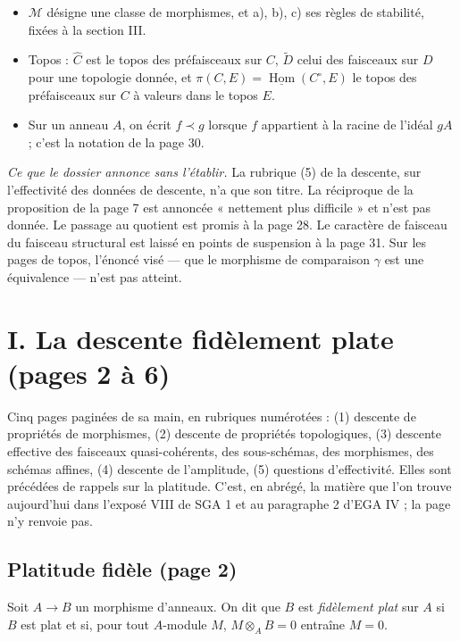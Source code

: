 \documentclass[11pt,a4paper]{article}
\begin{document}
\begin{itemize}
  « fidèlement plat et quasi-compact ».
  \item $\mathcal{M}$ désigne une classe de morphismes, et a), b), c) ses
  règles de stabilité, fixées à la section III.
  \item Topos : $\widehat{C}$ est le topos des préfaisceaux sur $C$,
  $\widetilde{D}$ celui des faisceaux sur $D$ pour une topologie donnée, et
  $\pi(C, E) = \underline{\operatorname{Hom}}(C^{\circ}, E)$ le topos des
  préfaisceaux sur $C$ à valeurs dans le topos $E$.
  \item Sur un anneau $A$, on écrit $f \prec g$ lorsque $f$ appartient à la
  racine de l'idéal $gA$ ; c'est la notation de la page 30.
\end{itemize}

\emph{Ce que le dossier annonce sans l'établir.} La rubrique (5) de la
descente, sur l'effectivité des données de descente, n'a que son titre. La
réciproque de la proposition de la page 7 est annoncée « nettement plus
difficile » et n'est pas donnée. Le passage au quotient est promis à la page 28.
Le caractère de faisceau du faisceau structural est laissé en points de
suspension à la page 31. Sur les pages de topos, l'énoncé visé --- que le
morphisme de comparaison $\gamma$ est une équivalence --- n'est pas atteint.

\section*{I. La descente fidèlement plate (pages 2 à 6)}

Cinq pages paginées de sa main, en rubriques numérotées : (1) descente de
propriétés de morphismes, (2) descente de propriétés topologiques, (3) descente
effective des faisceaux quasi-cohérents, des sous-schémas, des morphismes, des
schémas affines, (4) descente de l'amplitude, (5) questions d'effectivité.
Elles sont précédées de rappels sur la platitude. C'est, en abrégé, la matière
que l'on trouve aujourd'hui dans l'exposé VIII de SGA 1 et au paragraphe 2
d'EGA IV ; la page n'y renvoie pas.

\subsection*{Platitude fidèle (page 2)}

Soit $A \to B$ un morphisme d'anneaux. On dit que $B$ est \emph{fidèlement
plat} sur $A$ si $B$ est plat et si, pour tout $A$-module $M$,
$M \otimes_A B = 0$ entraîne $M = 0$.
\end{document}

